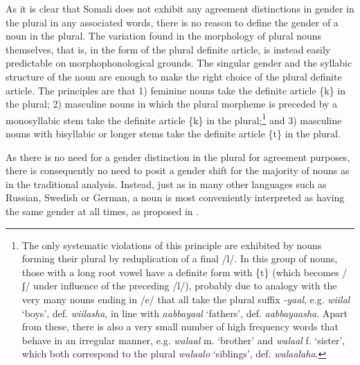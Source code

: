 \documentclass[output=paper]{langsci/langscibook}
\begin{document}
As it is clear that Somali does not exhibit any agreement distinctions in gender in the plural in any associated words, there is no reason to define the gender of a noun in the plural. The variation found in the morphology of plural nouns themselves, that is, in the form of the plural definite article, is instead easily predictable on morphophonological grounds. The singular gender and the syllabic structure of the noun are enough to make the right choice of the plural definite article. The principles are that 1) feminine nouns take the definite article \{k\} in the plural; 2) masculine nouns in which the plural morpheme is preceded by a monosyllabic stem take the definite article \{k\} in the plural;\footnote{The only systematic violations of this principle are exhibited by nouns forming their plural by reduplication of a final /l/. In this group of nouns, those with a long root vowel have a definite form with \{t\} (which becomes /ʃ/ under influence of the preceding /l/), probably due to analogy with the very many nouns ending in /e/ that all take the plural suffix \textit{{}-yaal}, e.g. \textit{wiilal} ‘boys’, def. \textit{wiilasha}, in line with \textit{aabbayaal} ‘fathers’, def. \textit{aabbayaasha}. Apart from these, there is also a very small number of high frequency words that behave in an irregular manner, e.g. \textit{walaal} m. ‘brother’ and \textit{walaal} f. ‘sister’, which both correspond to the plural \textit{walaalo} ‘siblings’, def. \textit{walaalaha}.} and 3) masculine nouns with bisyllabic or longer stems take the definite article \{t\} in the plural.

As there is no need for a gender distinction in the plural for agreement purposes, there is consequently no need to posit a gender shift for the majority of nouns as in the traditional analysis. Instead, just as in many other languages such as Russian, Swedish or German, a noun is most conveniently interpreted as having the same gender at all times, as proposed in . 
 
\end{document}
